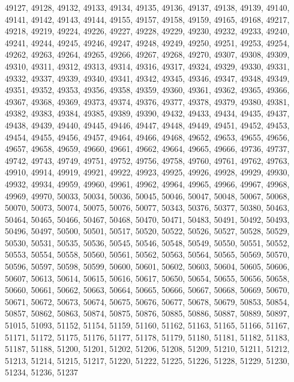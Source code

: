 \begin{small}
\begin{flushleft}
49127,
49128,
49132,
49133,
49134,
49135,
49136,
49137,
49138,
49139,
49140,
49141,
49142,
49143,
49144,
49155,
49157,
49158,
49159,
49165,
49168,
49217,
49218,
49219,
49224,
49226,
49227,
49228,
49229,
49230,
49232,
49233,
49240,
49241,
49244,
49245,
49246,
49247,
49248,
49249,
49250,
49251,
49253,
49254,
49262,
49263,
49264,
49265,
49266,
49267,
49268,
49270,
49307,
49308,
49309,
49310,
49311,
49312,
49313,
49314,
49316,
49317,
49324,
49329,
49330,
49331,
49332,
49337,
49339,
49340,
49341,
49342,
49345,
49346,
49347,
49348,
49349,
49351,
49352,
49353,
49356,
49358,
49359,
49360,
49361,
49362,
49365,
49366,
49367,
49368,
49369,
49373,
49374,
49376,
49377,
49378,
49379,
49380,
49381,
49382,
49383,
49384,
49385,
49389,
49390,
49432,
49433,
49434,
49435,
49437,
49438,
49439,
49440,
49445,
49446,
49447,
49448,
49449,
49451,
49452,
49453,
49454,
49455,
49456,
49457,
49464,
49466,
49468,
49652,
49653,
49655,
49656,
49657,
49658,
49659,
49660,
49661,
49662,
49664,
49665,
49666,
49736,
49737,
49742,
49743,
49749,
49751,
49752,
49756,
49758,
49760,
49761,
49762,
49763,
49910,
49914,
49919,
49921,
49922,
49923,
49925,
49926,
49928,
49929,
49930,
49932,
49934,
49959,
49960,
49961,
49962,
49964,
49965,
49966,
49967,
49968,
49969,
49970,
50033,
50034,
50036,
50045,
50046,
50047,
50048,
50067,
50068,
50070,
50073,
50074,
50075,
50076,
50077,
50343,
50376,
50377,
50380,
50463,
50464,
50465,
50466,
50467,
50468,
50470,
50471,
50483,
50491,
50492,
50493,
50496,
50497,
50500,
50501,
50517,
50520,
50522,
50526,
50527,
50528,
50529,
50530,
50531,
50535,
50536,
50545,
50546,
50548,
50549,
50550,
50551,
50552,
50553,
50554,
50558,
50560,
50561,
50562,
50563,
50564,
50565,
50569,
50570,
50596,
50597,
50598,
50599,
50600,
50601,
50602,
50603,
50604,
50605,
50606,
50607,
50613,
50614,
50615,
50616,
50617,
50650,
50654,
50655,
50656,
50658,
50660,
50661,
50662,
50663,
50664,
50665,
50666,
50667,
50668,
50669,
50670,
50671,
50672,
50673,
50674,
50675,
50676,
50677,
50678,
50679,
50853,
50854,
50857,
50862,
50863,
50874,
50875,
50876,
50885,
50886,
50887,
50889,
50897,
51015,
51093,
51152,
51154,
51159,
51160,
51162,
51163,
51165,
51166,
51167,
51171,
51172,
51175,
51176,
51177,
51178,
51179,
51180,
51181,
51182,
51183,
51187,
51188,
51200,
51201,
51202,
51206,
51208,
51209,
51210,
51211,
51212,
51213,
51214,
51215,
51217,
51220,
51222,
51225,
51226,
51228,
51229,
51230,
51234,
51236,
51237

\end{flushleft}
\end{small}